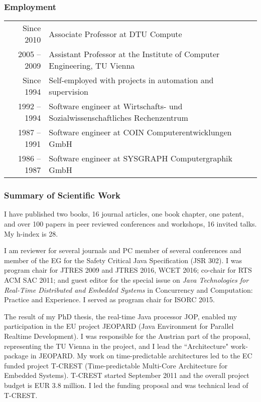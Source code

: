 \documentclass[%
    a4paper,
    12pt, %
    headinclude, footexclude,
    notitlepage,
    headsepline,
    pointlessnumbers,
    ]{scrartcl}
\begin{document}
\subsubsection*{Employment}
\begin{tabular}{rl}
Since 2010    & Associate Professor at DTU Compute\\
2005 -- 2009 & Assistant Professor at the Institute of Computer Engineering, TU Vienna\\
Since 1994   & Self-employed with projects in automation and supervision\\
1992 -- 1994 & Software engineer at Wirtschafts- und Sozialwissenschaftliches Rechenzentrum\\
1987 -- 1991 & Software engineer at COIN Computerentwicklungen GmbH\\
1986 -- 1987 & Software engineer at SYSGRAPH Computergraphik GmbH\\
\end{tabular}


\subsubsection*{Summary of Scientific Work}

I have published two books, 16 journal articles, one book chapter, one patent, and over 100
papers in peer reviewed conferences and workshops, 16 invited talks.  My h-index is 28.

I am reviewer for several journals and PC member of several conferences and
member of the EG for the Safety Critical Java Specification (JSR 302).
I was program chair for JTRES 2009 and JTRES 2016, WCET 2016; co-chair for RTS ACM SAC 2011;
and  guest editor for the special issue on \emph{Java
      Technologies for Real-Time Distributed and Embedded
      Systems} in Concurrency and Computation: Practice and
      Experience.
I served as program chair for ISORC 2015.


The result of my PhD thesis, the real-time Java processor JOP,
enabled my participation in the EU project JEOPARD (Java Environment
for Parallel Realtime
Development).
I was responsible for the Austrian part of the proposal, representing the
TU Vienna in the project, and I lead the ``Architecture"
work-package in JEOPARD.
My work on time-predictable architectures led to the EC funded project
T-CREST (Time-predictable Multi-Core Architecture for Embedded
Systems). T-CREST started September 2011 and the overall project budget
is EUR 3.8 million. I led the funding proposal and was technical lead of
T-CREST.
\end{document}
